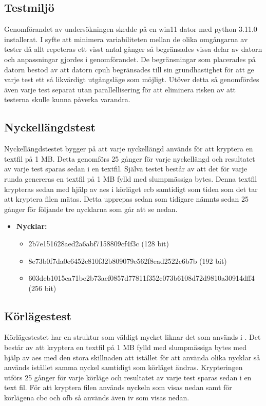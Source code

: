 \subsection{Testmiljö} %
Genomförandet av undersökningen skedde på en \gls{win11} dator med \gls{python} 3.11.0 installerat. I syfte att minimera variabiliteten
mellan de olika omgångarna av tester då allt repeteras ett visst antal gånger så begränsades vissa delar av datorn och anpassningar gjordes i genomförandet.
De begränsningar som placerades på datorn bestod av att datorn \gls{cpuh} begränsades till sin grundhastighet för att ge
varje test ett så likvärdigt utgångsläge som möjligt. Utöver detta så genomfördes även varje test separat utan parallellisering för att
eliminera risken av att testerna skulle kunna påverka varandra.

\subsection{Nyckellängdstest} %
\label{sec:nyckellangd-test}
Nyckellängdstestet bygger på att varje nyckellängd används för att kryptera en textfil på 1 MB. Detta genomförs 25 gånger för
varje nyckellängd och resultatet av varje test sparas sedan i en textfil. Själva testet består av att det för varje runda
genereras en textfil på 1 MB fylld med slumpmässiga \gls{byte}s. Denna textfil krypteras sedan med hjälp av \acrshort{aes} i körläget \acrshort{ecb} samtidigt
som tiden som det tar att kryptera filen mätas. Detta upprepas sedan som tidigare nämnts sedan 25 gånger för följande tre nycklarna som går att se nedan.

\begin{itemize}
    \item []\textbf{Nycklar:}
    \begin{itemize}
        \item 2b7e151628aed2a6abf7158809cf4f3c (128 bit)
        \item 8e73b0f7da0e6452c810f32b809079e562f8ead2522c6b7b (192 bit)
        \item 603deb1015ca71be2b73aef0857d77811f352c073b6108d72d9810a30914dff4 (256 bit)
    \end{itemize}
\end{itemize}

\subsection{Körlägestest} %
\label{sec:körlages-test}
Körlägestestet har en struktur som väldigt mycket liknar det som används i . Det
består av att kryptera en textfil på 1 MB fylld med slumpmässiga bytes med hjälp av \acrshort{aes} med den stora skillnaden att istället för att använda olika nycklar så används
istället samma nyckel samtidigt som körläget ändras. Krypteringen utförs 25 gånger för varje körläge och resultatet av varje test sparas sedan i en text fil.
För att kryptera filen används nyckeln som visas nedan samt för körlägena \acrshort{cbc} och \acrshort{ofb} så används även \acrshort{iv} som visas nedan.

